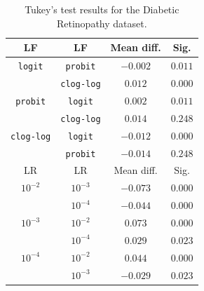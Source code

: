 \documentclass[journal]{IEEEtran}
\begin{document}

	
	\begin{table}[!t]
		\caption{Tukey's test results for the Diabetic Retinopathy dataset.}
		\label{table:TukeyDR}
		\centering
		\begin{tabular}{cccc}
			\hline\hline
			       LF         &        LF         & Mean diff. &  Sig.   \\ \hline
			 \texttt{logit}   &  \texttt{probit}  &  $-0.002$  & $0.011$ \\
			                  & \texttt{clog-log} &  $0.012$   & $0.000$ \\
			 \texttt{probit}  &  \texttt{logit}   &  $0.002$   & $0.011$ \\
			                  & \texttt{clog-log} &  $0.014$   & $0.248$ \\
			\texttt{clog-log} &  \texttt{logit}   &  $-0.012$  & $0.000$ \\
			                  &  \texttt{probit}  &  $-0.014$  & $0.248$ \\ \hline\hline
			       LR         &        LR         & Mean diff. &  Sig.   \\ \hline
			    $10^{-2}$     &     $10^{-3}$     &  $-0.073$  & $0.000$ \\
			                  &     $10^{-4}$     &  $-0.044$  & $0.000$ \\
			    $10^{-3}$     &     $10^{-2}$     &  $0.073$   & $0.000$ \\
			                  &     $10^{-4}$     &  $0.029$   & $0.023$ \\
			    $10^{-4}$     &     $10^{-2}$     &  $0.044$   & $0.000$ \\
			                  &     $10^{-3}$     &  $-0.029$  & $0.023$ \\ \hline\hline
		\end{tabular}
	\end{table}
	
\end{document}
